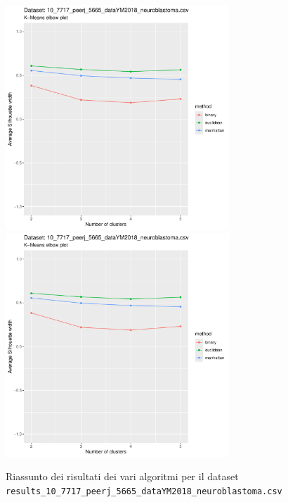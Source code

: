 \documentclass[12pt]{report}
\begin{document}
			\begin{figure}[h]
				\centering
				\includegraphics[width = 0.75\textwidth, height = 0.45\textheight, page = 9]{
					results/results_10_7717_peerj_5665_dataYM2018_neuroblastoma.csv.pdf
				}
				\includegraphics[width = 0.75\textwidth, height = 0.45\textheight, page = 10]{
					results/results_10_7717_peerj_5665_dataYM2018_neuroblastoma.csv.pdf
				}
				\caption{Riassunto dei risultati dei vari algoritmi per il dataset
				\texttt{results\_10\_7717\_peerj\_5665\_dataYM2018\_neuroblastoma.csv}}
				\label{fig:comp3}
			\end{figure}
\end{document}
